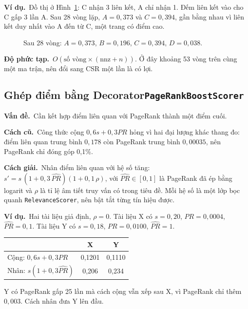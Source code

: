 \documentclass[9pt,twocolumn,a4paper]{extarticle}
\newcommand{\code}[1]{\texttt{#1}}
\newcommand{\dsa}[2]{\subsection[#1]{#1\hfill{\normalfont\footnotesize\code{#2}}}}
\newcommand{\vande}{\textcolor{linkblue}{\textbf{Vấn đề.}}~}
\newcommand{\cachgiai}{\textcolor{linkblue}{\textbf{Cách giải.}}~}
\newcommand{\dpt}{\textcolor{linkblue}{\textbf{Độ phức tạp.}}~}
\newcommand{\cu}{\textcolor{linkblue}{\textbf{Cách cũ.}}~}
\newcommand{\vidu}{\textcolor{linkblue}{\textbf{Ví dụ.}}~}
\begin{document}
\vidu Đồ thị ở Hình~\ref{fig:prgraph}: C nhận 3 liên kết, A chỉ nhận 1. Đếm liên kết vào cho C gấp 3 lần A. Sau 28 vòng lặp, $A=0{,}373$ và $C=0{,}394$, gần bằng nhau vì liên kết duy nhất vào A đến từ C, một trang có điểm cao.

\begin{figure}[H]
\centering
{}
\caption{Sau 28 vòng: $A=0{,}373$, $B=0{,}196$, $C=0{,}394$, $D=0{,}038$.}
\label{fig:prgraph}
\end{figure}

\dpt $O(\text{số vòng}\times(\text{nnz}+n))$. Ở đây khoảng 53 vòng trên cùng một ma trận, nên đổi sang CSR một lần là có lợi.

\dsa{Ghép điểm bằng Decorator}{PageRankBoostScorer}
\vande Cần kết hợp điểm liên quan với PageRank thành một điểm cuối.

\cu Công thức cộng $0{,}6s+0{,}3PR$ hỏng vì hai đại lượng khác thang đo: điểm liên quan trung bình $0{,}178$ còn PageRank trung bình $0{,}00035$, nên PageRank chỉ đóng góp 0,1\%.

\cachgiai Nhân điểm liên quan với hệ số tăng: $s'=s\,(1+0{,}3\,\widehat{PR})(1+0{,}1\,\rho)$, với $\widehat{PR}\in[0,1]$ là PageRank đã ép bằng logarit và $\rho$ là tỉ lệ âm tiết truy vấn có trong tiêu đề. Mỗi hệ số là một lớp bọc quanh \code{RelevanceScorer}, nên bật tắt từng tín hiệu được.

\vidu Hai tài liệu giả định, $\rho=0$. Tài liệu X có $s=0{,}20$, $PR=0{,}0004$, $\widehat{PR}=0{,}1$. Tài liệu Y có $s=0{,}18$, $PR=0{,}0100$, $\widehat{PR}=1$.
\begin{center}\footnotesize
\begin{tabular}{@{}lcc@{}}
\toprule
& X & Y \\
\midrule
Cộng: $0{,}6s+0{,}3PR$ & 0,1201 & 0,1110 \\
Nhân: $s(1+0{,}3\widehat{PR})$ & 0,206 & 0,234 \\
\bottomrule
\end{tabular}
\end{center}
Y có PageRank gấp 25 lần mà cách cộng vẫn xếp sau X, vì PageRank chỉ thêm $0{,}003$. Cách nhân đưa Y lên đầu.
\end{document}
